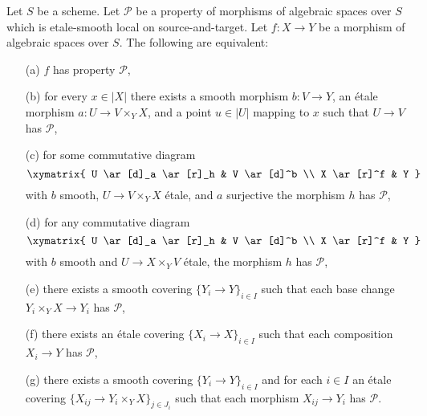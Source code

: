 \begin{lemma}
\label{lemma-etale-smooth-local-source-target-characterize}
Let $S$ be a scheme.
Let $\mathcal{P}$ be a property of morphisms of algebraic spaces over $S$
which is etale-smooth local on source-and-target.
Let $f : X \to Y$ be a morphism
of algebraic spaces over $S$. The following are equivalent:
\begin{enumerate}
\item[(a)] $f$ has property $\mathcal{P}$,
\item[(b)] for every $x \in |X|$ there exists a smooth morphism $b : V \to Y$,
an \'etale morphism $a : U \to V \times_Y X$, and a point $u \in |U|$
mapping to $x$ such that $U \to V$ has $\mathcal{P}$,
\item[(c)] for some commutative diagram
$$
\xymatrix{
U \ar[d]_a \ar[r]_h & V \ar[d]^b \\
X \ar[r]^f & Y
}
$$
with $b$ smooth, $U \to V \times_Y X$ \'etale, and $a$ surjective
the morphism $h$ has $\mathcal{P}$,
\item[(d)] for any commutative diagram
$$
\xymatrix{
U \ar[d]_a \ar[r]_h & V \ar[d]^b \\
X \ar[r]^f & Y
}
$$
with $b$ smooth and $U \to X \times_Y V$ \'etale, the morphism $h$
has $\mathcal{P}$,
\item[(e)] there exists a smooth covering $\{Y_i \to Y\}_{i \in I}$ such
that each base change $Y_i \times_Y X \to Y_i$ has $\mathcal{P}$,
\item[(f)] there exists an \'etale covering $\{X_i \to X\}_{i \in I}$ such
that each composition $X_i \to Y$ has $\mathcal{P}$,
\item[(g)] there exists a smooth covering $\{Y_i \to Y\}_{i \in I}$ and
for each $i \in I$ an \'etale covering
$\{X_{ij} \to Y_i \times_Y X\}_{j \in J_i}$ such that each morphism
$X_{ij} \to Y_i$ has $\mathcal{P}$.
\end{enumerate}
\end{lemma}

